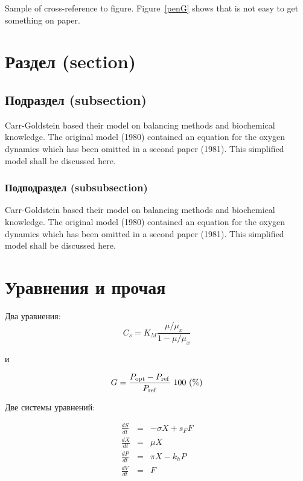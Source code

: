 \documentclass[final,pdftex]{epsilonj}
\numberwithin{equation}{section}
\begin{document}
Sample of cross-reference to figure.
Figure~\ref{penG} shows that is not easy to get something on paper.



\section{Раздел (section)}

\subsection{Подраздел (subsection)}
Carr-Goldstein based their model on balancing methods and
biochemical know\-ledge. The original model (1980) contained an equation for the
oxygen dynamics which has been omitted in a second paper
(1981). This simplified model shall be discussed here.

\subsubsection{Подподраздел (subsubsection)}
Carr-Goldstein
based their model on balancing methods and
biochemical know\-ledge. The original model (1980) contained an equation for the
oxygen dynamics which has been omitted in a second paper
(1981). This simplified model shall be discussed here.

\section{Уравнения и прочая}

Два уравнения:
\begin{equation}
    C_{s}  =  K_{M} \frac{\mu/\mu_{x}}{1-\mu/\mu_{x}} \label{ccs}
\end{equation}

и

\begin{equation}
    G = \frac{P_{\rm opt} - P_{\rm ref}}{P_{\rm ref}} \mbox{\ }100 \mbox{\ }(\%)
\end{equation}

Две системы уравнений:

\begin{eqnarray}
  \frac{dS}{dt} & = & - \sigma X + s_{F} F\\
  \frac{dX}{dt} & = &   \mu    X\\
  \frac{dP}{dt} & = &   \pi    X - k_{h} P\\
  \frac{dV}{dt} & = &   F
\end{eqnarray}
\end{document}
